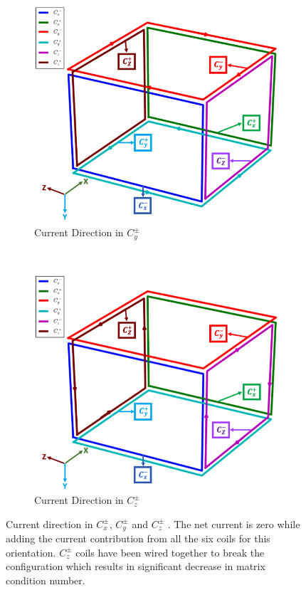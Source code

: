 \begin{figure}
\begin{subfigure}{.5\linewidth}
        \includegraphics[scale=.28]{Images/c3}
        \caption{Current Direction in $C_y^{\pm}$}
        \label{fig:c3}
    \end{subfigure}\\[1ex]
    \begin{subfigure}{\linewidth}
        \centering
        \includegraphics[scale=.33]{Images/c5}
        \caption{Current Direction in $C_z^{\pm}$}
        \label{fig:c5}
    \end{subfigure}
    \caption{Current direction in $C_x^{\pm}$, $C_y^{\pm}$ and $C_z^{\pm}$ . The net current is zero while adding the current contribution from all the six coils for this orientation. $C_z^{\pm}$ coils have been wired together to break the configuration which results in significant decrease in matrix condition number. }
    \label{fig:cDir}
\end{figure}

